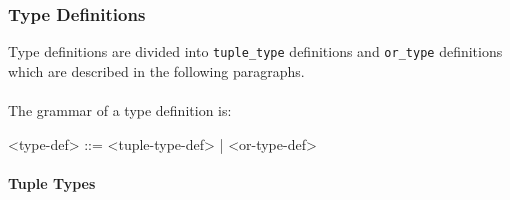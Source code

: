 \documentclass{article}
\begin{document}
\newpage

\subsubsection{Type Definitions}
\label{subsubsec:tdefs}

Type definitions are divided into \verb|tuple_type| definitions and
\verb|or_type| definitions which are described in the following paragraphs.
\\\\
The grammar of a type definition is:
\begin{grammar}
<type-def> ::= <tuple-type-def> | <or-type-def>
\end{grammar}

\paragraph{Tuple Types}
\end{document}
